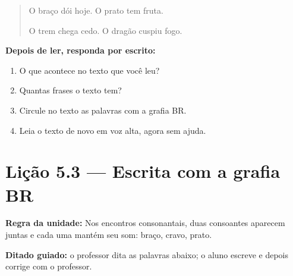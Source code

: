 \begin{quote}
O braço dói hoje. O prato tem fruta.

O trem chega cedo. O dragão cuspiu fogo.
\end{quote}

\textbf{Depois de ler, responda por escrito:}
\begin{enumerate}

  \item O que acontece no texto que você leu?
  \begin{center}
  \underline{\hspace{12cm}}
  \end{center}

  \item Quantas frases o texto tem?
  \begin{center}
  \underline{\hspace{12cm}}
  \end{center}

  \item Circule no texto as palavras com a grafia BR.

  \item Leia o texto de novo em voz alta, agora sem ajuda.

\end{enumerate}

\section{Lição 5.3 --- Escrita com a grafia BR}

\noindent\textbf{Regra da unidade:} Nos encontros consonantais, duas consoantes aparecem juntas e cada uma mantém seu som: braço, cravo, prato.


\noindent\textbf{Ditado guiado:} o professor dita as palavras abaixo; o aluno escreve e depois corrige com o professor.

\begin{center}
  \underline{\hspace{2.3cm}} \quad \underline{\hspace{2.3cm}} \quad \underline{\hspace{2.3cm}} \quad \underline{\hspace{2.3cm}}

  \underline{\hspace{2.3cm}} \quad \underline{\hspace{2.3cm}} \quad \underline{\hspace{2.3cm}} \quad \underline{\hspace{2.3cm}}
\end{center}

